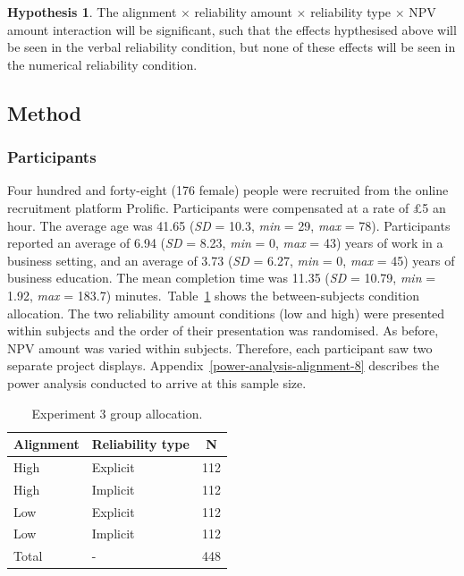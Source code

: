 \documentclass[a4paper, nobind, dvipsnames]{templates/ociamthesis}
\theoremstyle{definition}
\theoremstyle{definition}
\theoremstyle{definition}
\theoremstyle{definition}
\newtheorem{hypothesis}{Hypothesis}[chapter]
\theoremstyle{remark}
\begin{document}
\begin{hypothesis}
\protect\hypertarget{hyp:four-way-alignment-8}{}{\label{hyp:four-way-alignment-8} }The alignment \(\times\) reliability amount \(\times\) reliability type \(\times\) NPV
amount interaction will be significant, such that the effects hypthesised above
will be seen in the verbal reliability condition, but none of these effects
will be seen in the numerical reliability condition.
\end{hypothesis}

\subsection{Method}

\subsubsection{Participants}

Four hundred and forty-eight (176 female) people were recruited from the online recruitment platform Prolific. Participants were compensated at a rate of £5 an hour. The average age was 41.65 (\emph{SD} = 10.3, \emph{min} = 29, \emph{max} = 78). Participants reported an average of 6.94 (\emph{SD} = 8.23, \emph{min} = 0, \emph{max} = 43) years of work in a business setting, and an average of 3.73 (\emph{SD} = 6.27, \emph{min} = 0, \emph{max} = 45) years of business education. The mean completion time was 11.35 (\emph{SD} = 10.79, \emph{min} = 1.92, \emph{max} = 183.7) minutes.~Table~\ref{tab:condition-allocation-alignment-8}
shows the between-subjects condition allocation. The two reliability amount
conditions (low and high) were presented within subjects and the order of their
presentation was randomised. As before, NPV amount was varied within subjects.
Therefore, each participant saw two separate project displays.
Appendix~\ref{power-analysis-alignment-8} describes the power analysis
conducted to arrive at this sample size.

\begin{table}[tbp]

\begin{center}
\begin{threeparttable}

\caption{\label{tab:condition-allocation-alignment-8}Experiment 3 group allocation.}

\begin{tabular}{lll}
\toprule
Alignment & \multicolumn{1}{c}{Reliability type} & \multicolumn{1}{c}{N}\\
\midrule
High & Explicit & 112\\
High & Implicit & 112\\
Low & Explicit & 112\\
Low & Implicit & 112\\
Total & - & 448\\
\bottomrule
\end{tabular}

\end{threeparttable}
\end{center}

\end{table}
\end{document}
